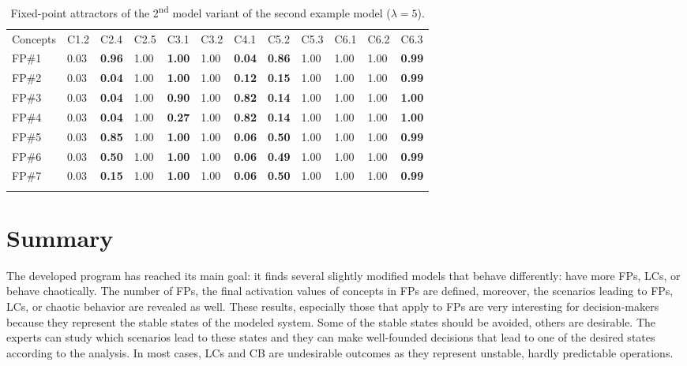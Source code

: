 \documentclass[graybox]{svmult}
\begin{document}
\begin{table}
\caption{Fixed-point attractors of the 2\textsuperscript{nd} model variant of the second example model ($\lambda = 5$).}
\label{tab:BP2SpartialV2-FPs}
\begin{center}
\begin{tabular}{llllllllllll}
\hline\noalign{\smallskip}
Concepts & C1.2 & C2.4 & C2.5 & C3.1 & C3.2 & C4.1 & C5.2 & C5.3 & C6.1 & C6.2 & C6.3\\
\noalign{\smallskip}\svhline\noalign{\smallskip}
FP\#1 & 0.03 & \textbf{0.96} & 1.00 & \textbf{1.00} & 1.00 & \textbf{0.04} & \textbf{0.86} & 1.00 & 1.00 & 1.00 & \textbf{0.99}\\
FP\#2 & 0.03 & \textbf{0.04} & 1.00 & \textbf{1.00} & 1.00 & \textbf{0.12} & \textbf{0.15} & 1.00 & 1.00 & 1.00 & \textbf{0.99}\\
FP\#3 & 0.03 & \textbf{0.04} & 1.00 & \textbf{0.90} & 1.00 & \textbf{0.82} & \textbf{0.14} & 1.00 & 1.00 & 1.00 & \textbf{1.00}\\
FP\#4 & 0.03 & \textbf{0.04} & 1.00 & \textbf{0.27} & 1.00 & \textbf{0.82} & \textbf{0.14} & 1.00 & 1.00 & 1.00 & \textbf{1.00}\\
FP\#5 & 0.03 & \textbf{0.85} & 1.00 & \textbf{1.00} & 1.00 & \textbf{0.06} & \textbf{0.50} & 1.00 & 1.00 & 1.00 & \textbf{0.99}\\
FP\#6 & 0.03 & \textbf{0.50} & 1.00 & \textbf{1.00} & 1.00 & \textbf{0.06} & \textbf{0.49} & 1.00 & 1.00 & 1.00 & \textbf{0.99}\\
FP\#7 & 0.03 & \textbf{0.15} & 1.00 & \textbf{1.00} & 1.00 & \textbf{0.06} & \textbf{0.50} & 1.00 & 1.00 & 1.00 & \textbf{0.99}\\
\noalign{\smallskip}\hline
\end{tabular}
\end{center}
\end{table}

\section{Summary}
The developed program has reached its main goal: it finds several slightly modified models that behave differently: have more FPs, LCs, or behave chaotically. The number of FPs, the final activation values of concepts in FPs are defined, moreover, the scenarios leading to FPs, LCs, or chaotic behavior are revealed as well. These results, especially those that apply to FPs are very interesting for decision-makers because they represent the stable states of the modeled system. Some of the stable states should be avoided, others are desirable. The experts can study which scenarios lead to these states and they can make well-founded decisions that lead to one of the desired states according to the analysis. In most cases, LCs and CB are undesirable outcomes as they represent unstable, hardly predictable operations.
\end{document}
